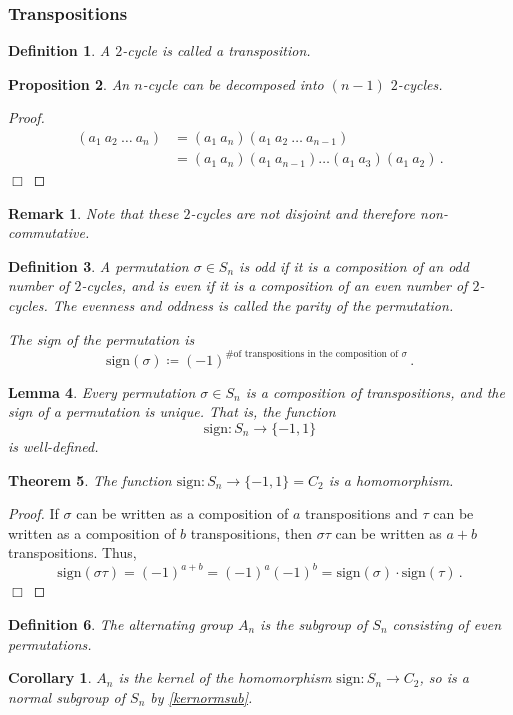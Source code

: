 \documentclass{article}
\theoremstyle{plain}\theoremheaderfont{\normalfont\itshape}\theorembodyfont{\rmfamily}\theoremseparator{.}\newtheorem*{rem}{Remark}\newtheorem*{ex}{Example}\newtheorem*{proof}{Proof}\newtheorem*{altp}{Alternative proof}
\theoremstyle{plain}\theoremheaderfont{\normalfont\bfseries}\theorembodyfont{\rmfamily}\theoremseparator{.}\newtheorem{thm}{Theorem}[section]\newtheorem{lem}[thm]{Lemma}\newtheorem{prop}[thm]{Proposition}\newtheorem*{cor}{Corollary}\newtheorem{defn}[thm]{Definition}\newtheorem{clm}[thm]{Claim}\newtheorem{clminproof}{Claim}
\theoremstyle{break}\theoremheaderfont{\normalfont\itshape}\theorembodyfont{\rmfamily}\theoremseparator{.\medskip}\newtheorem*{proofskip}{Proof}\newtheorem*{exs}{Examples}\newtheorem*{rems}{Remarks}
\theoremstyle{break}\theoremheaderfont{\normalfont\bfseries}\theorembodyfont{\rmfamily}\theoremseparator{.\medskip}\newtheorem{lemskip}[thm]{Lemma}\newtheorem{defnskip}[thm]{Definition}\newtheorem{propskip}[thm]{Proposition}\newtheorem{thmskip}[thm]{Theorem}
\numberwithin{equation}{section}
\newcommand{\qed}{\hfill\ensuremath{\Box}}
\begin{document}
	\subsubsection{Transpositions}
	\begin{defn}
		A \(2\)-cycle is called a \textit{transposition}.
	\end{defn}
	\begin{prop}
		An \(n\)-cycle can be decomposed into \((n-1)\) \(2\)-cycles.
	\end{prop}
	\begin{proof}
		\begin{align*}
			(a_1 ~ a_2 ~ \dots ~ a_n)&=(a_1 ~ a_n) (a_1 ~ a_2 ~ \dots ~ a_{n-1})\\
			&=(a_1~a_n)(a_1~a_{n-1})\dots(a_1~a_3)(a_1~a_2)\,.
		\end{align*}\qed
	\end{proof}
	\begin{rem}
		Note that these \(2\)-cycles are not disjoint and therefore non-commutative.
	\end{rem}
	\begin{defn}
		A permutation \(\sigma\in S_n\) is \textit{odd} if it is a composition of an odd number of \(2\)-cycles, and is \textit{even} if it is a composition of an even number of \(2\)-cycles. The evenness and oddness is called the \textit{parity} of the permutation.

		The \textit{sign} of the permutation is
		\[\mathrm{sign}(\sigma)\coloneqq (-1)^{\#\text{of transpositions in the composition of }\sigma}\,.\]
	\end{defn}
	\begin{lem}
		Every permutation \(\sigma\in S_n\) is a composition of transpositions, and the sign of a permutation is unique. That is, the function
		\[\mathrm{sign}:S_n\to\{-1,1\}\]
		is well-defined.
	\end{lem}
	\begin{thm}
		The function \(\mathrm{sign}:S_n\to\{-1,1\}=C_2\) is a homomorphism.
	\end{thm}
	\begin{proof}
		If \(\sigma\) can be written as a composition of \(a\) transpositions and \(\tau\) can be written as a composition of \(b\) transpositions, then \(\sigma\tau\) can be written as \(a+b\) transpositions. Thus,
		\[\mathrm{sign}(\sigma\tau)=(-1)^{a+b}=(-1)^a(-1)^b=\mathrm{sign}(\sigma)\cdot\mathrm{sign}(\tau)\,.\]
		\qed
	\end{proof}
	\begin{defn}
		The \textit{alternating group} \(A_n\) is the subgroup of \(S_n\) consisting of even permutations.
	\end{defn}
	\begin{cor}
		\(A_n\) is the kernel of the homomorphism \(\mathrm{sign} : S_n \to C_2\), so is a normal subgroup of \(S_n\) by \cref{kernormsub}.
	\end{cor}
\end{document}
